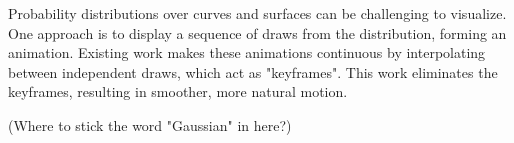 Probability distributions over curves and surfaces can be challenging to visualize.  One approach is to display a sequence of draws from the distribution, forming an animation.  Existing work makes these animations continuous by interpolating between independent draws, which act as "keyframes".  This work eliminates the keyframes, resulting in smoother, more natural motion.

(Where to stick the word "Gaussian" in here?)